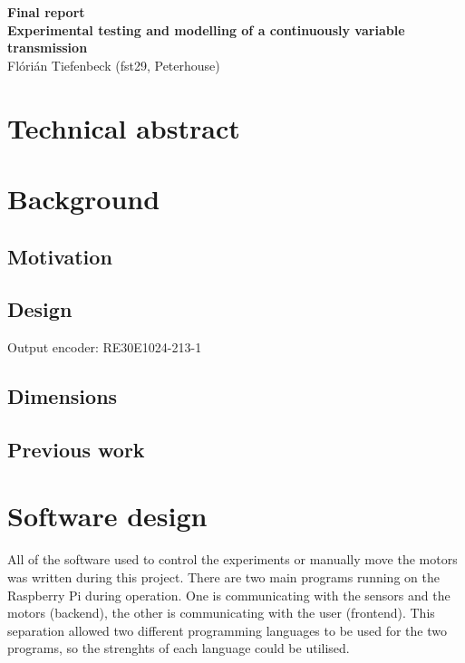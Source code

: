 \documentclass[12pt]{article}
\author{Flórián Tiefenbeck (fst29)}
\begin{document}
\begin{center}
{\Huge \bf Final report}\\
\vspace{6pt}
{\LARGE \bf Experimental testing and modelling of a continuously variable transmission}\\
\vspace{4pt}
{\LARGE Flórián Tiefenbeck (fst29, Peterhouse)}\\
\end{center}

\section{Technical abstract}

\section{Background}

\subsection{Motivation}

\subsection{Design}

Output encoder: RE30E1024-213-1

\subsection{Dimensions}

\subsection{Previous work}



\section{Software design}
All of the software used to control the experiments or manually move the motors was written during this project. There are two main programs running on the Raspberry Pi during operation. One is communicating with the sensors and the motors (backend), the other is communicating with the user (frontend). This separation allowed two different programming languages to be used for the two programs, so the strenghts of each language could be utilised.
\end{document}
